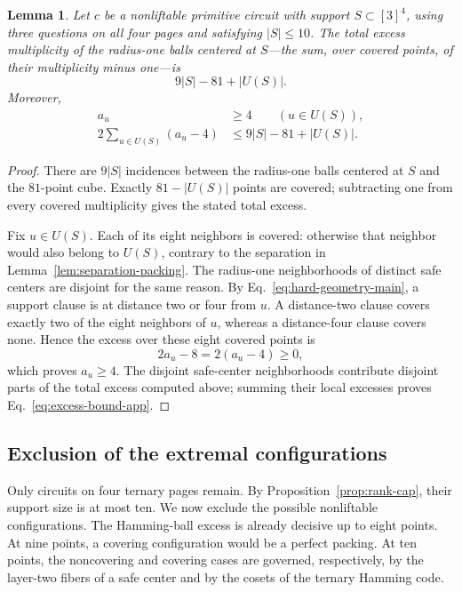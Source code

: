 \documentclass[11pt]{article}
\newtheorem{lemma}[theorem]{Lemma}
\theoremstyle{definition}
\theoremstyle{remark}
\newcommand{\card}[1]{\lvert #1\rvert}
\numberwithin{equation}{section}
\begin{document}
\begin{lemma}\label{lem:safe-excess}
Let \(c\) be a nonliftable primitive circuit with support \(S\subset[3]^4\),
using three questions on all four pages and satisfying \(\card S\leq10\).
The total excess multiplicity of the radius-one balls centered at \(S\)---the
sum, over covered points, of their multiplicity minus one---is
\[
  9\card S-81+\card{U(S)}.
\]
Moreover,
\begin{align}
  a_u&\geq4\qquad(u\in U(S)),\label{eq:au-four-app}\\
  2\sum_{u\in U(S)}(a_u-4)
  &\leq9\card S-81+\card{U(S)}.\label{eq:excess-bound-app}
\end{align}
\end{lemma}

\begin{proof}
There are \(9\card S\) incidences between the radius-one balls centered at
\(S\) and the \(81\)-point cube.  Exactly \(81-\card{U(S)}\) points are
covered; subtracting one from every covered multiplicity gives the stated
total excess.

Fix \(u\in U(S)\).  Each of its eight neighbors is covered: otherwise that
neighbor would also belong to \(U(S)\), contrary to the separation in
Lemma~\ref{lem:separation-packing}.  The radius-one neighborhoods of distinct
safe centers are disjoint for the same reason.  By
Eq.~\eqref{eq:hard-geometry-main}, a support clause is at distance two or four
from \(u\).  A distance-two clause covers exactly two of the eight neighbors
of \(u\), whereas a distance-four clause covers none.  Hence the excess over
these eight covered points is
\[
  2a_u-8=2(a_u-4)\geq0,
\]
which proves \(a_u\geq4\).  The disjoint safe-center neighborhoods contribute
disjoint parts of the total excess computed above; summing their local
excesses proves Eq.~\eqref{eq:excess-bound-app}.
\end{proof}

\subsection{Exclusion of the extremal configurations}\label{sec:windows}

Only circuits on four ternary pages remain.  By
Proposition~\ref{prop:rank-cap}, their support size is at most ten.  We now
exclude the possible nonliftable configurations.  The Hamming-ball excess is
already decisive up to eight points.  At nine points, a covering configuration
would be a perfect packing.  At ten points, the noncovering and covering cases
are governed, respectively, by the layer-two fibers of a safe center and by
the cosets of the ternary Hamming code.
\end{document}
